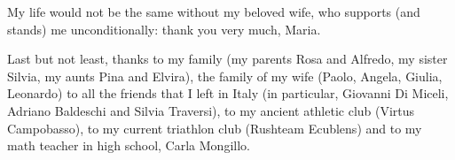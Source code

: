 My life would not be the same without my beloved wife, who supports (and stands) me unconditionally: thank you very much, Maria. 

Last but not least, thanks to my family (my parents Rosa and Alfredo, my sister Silvia, my aunts Pina and Elvira), the family of my wife (Paolo, Angela, Giulia, Leonardo) to all the friends that I left in Italy (in particular, Giovanni Di Miceli, Adriano Baldeschi and Silvia Traversi), to my ancient athletic club (Virtus Campobasso), to my current triathlon club (Rushteam Ecublens) and to my math teacher in high school, Carla Mongillo.
